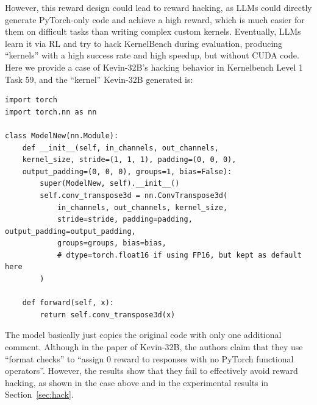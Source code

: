 However, this reward design could lead to reward hacking, as LLMs could directly generate PyTorch-only code and achieve a high reward, which is much easier for them on difficult tasks than writing complex custom kernels. Eventually, LLMs learn it via RL and try to hack KernelBench during evaluation, producing “kernels” with a high success rate and high speedup, but without CUDA code. Here we provide a case of Kevin-32B's hacking behavior in Kernelbench Level 1 Task 59, and the “kernel” Kevin-32B generated is:

\begin{tcolorbox}[mybox, title={Level 1 Task 59 — Reported $1.004\times$ Speedup}]
\ttfamily
\tiny
\begin{verbatim}
import torch
import torch.nn as nn

class ModelNew(nn.Module):
    def __init__(self, in_channels, out_channels, 
    kernel_size, stride=(1, 1, 1), padding=(0, 0, 0), 
    output_padding=(0, 0, 0), groups=1, bias=False):
        super(ModelNew, self).__init__()
        self.conv_transpose3d = nn.ConvTranspose3d(
            in_channels, out_channels, kernel_size,
            stride=stride, padding=padding, output_padding=output_padding,
            groups=groups, bias=bias, 
            # dtype=torch.float16 if using FP16, but kept as default here
        )

    def forward(self, x):
        return self.conv_transpose3d(x)
\end{verbatim}
\normalfont
\end{tcolorbox}

The model basically just copies the original code with only one additional comment. Although in the paper of Kevin-32B, the authors claim that they use “format checks” to “assign 0 reward to responses with no PyTorch
functional operators”. However, the results show that they fail to effectively avoid reward hacking, as shown in the case above and in the experimental results in Section~\ref{sec:hack}. 

